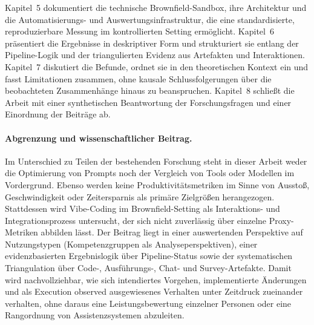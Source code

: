 Kapitel~5 dokumentiert die technische Brownfield-Sandbox, ihre Architektur und die Automatisierungs- und Auswertungsinfrastruktur, die eine standardisierte, reproduzierbare Messung im kontrollierten Setting ermöglicht.
Kapitel~6 präsentiert die Ergebnisse in deskriptiver Form und strukturiert sie entlang der Pipeline-Logik und der triangulierten Evidenz aus Artefakten und Interaktionen.
Kapitel~7 diskutiert die Befunde, ordnet sie in den theoretischen Kontext ein und fasst Limitationen zusammen, ohne kausale Schlussfolgerungen über die beobachteten Zusammenhänge hinaus zu beanspruchen.
Kapitel~8 schließt die Arbeit mit einer synthetischen Beantwortung der Forschungsfragen und einer Einordnung der Beiträge ab.

\paragraph{Abgrenzung und wissenschaftlicher Beitrag.}
Im Unterschied zu Teilen der bestehenden Forschung steht in dieser Arbeit weder die Optimierung von Prompts noch der Vergleich von Tools oder Modellen im Vordergrund.
Ebenso werden keine Produktivitätsmetriken im Sinne von Ausstoß, Geschwindigkeit oder Zeitersparnis als primäre Zielgrößen herangezogen.
Stattdessen wird Vibe-Coding im Brownfield-Setting als Interaktions- und Integrationsprozess untersucht, der sich nicht zuverlässig über einzelne Proxy-Metriken abbilden lässt.
Der Beitrag liegt in einer auswertenden Perspektive auf Nutzungstypen (Kompetenzgruppen als Analyseperspektiven), einer evidenzbasierten Ergebnislogik über Pipeline-Status sowie der systematischen Triangulation über Code-, Ausführungs-, Chat- und Survey-Artefakte.
Damit wird nachvollziehbar, wie sich intendiertes Vorgehen, implementierte Änderungen und als Execution observed ausgewiesenes Verhalten unter Zeitdruck zueinander verhalten, ohne daraus eine Leistungsbewertung einzelner Personen oder eine Rangordnung von Assistenzsystemen abzuleiten.
